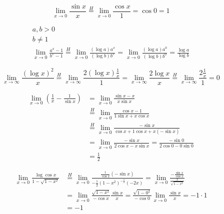 \begin{bsp}
	\[ \lim_{x \rightarrow 0} \frac{\sin x}{x} \overset{H}{=} \lim_{x \rightarrow 0} \frac{\cos x}{1} = \cos 0 = 1 \]
\end{bsp}
\begin{bsp}
	\begin{gather*}
		a,b > 0 \\
		b \neq 1 \\
		\lim_{x \rightarrow 0} \frac{a^x - 1}{b^x - 1} \overset{H}{=} \lim_{x \rightarrow 0} \frac{(\log a)a^x}{(\log b)b^x} = \lim_{x \rightarrow 0} \frac{(\log a)a^0}{(\log b)b^0} = \frac{\log a}{\log b}
	\end{gather*}
\end{bsp}
\begin{bsp}
	\[ \lim_{x \rightarrow \infty} \frac{(\log x)^2}{x} \overset{H}{=} \lim_{x \rightarrow \infty} \frac{2(\log x) \frac{1}{x}}{1} = \lim_{x \rightarrow \infty} \frac{2 \log x}{x} \overset{H}{=} \lim_{x \rightarrow \infty} \frac{2 \frac{1}{x}}{1} = 0 \]
\end{bsp}
\begin{bsp}
	\[ \begin{split}
		\lim_{x \rightarrow 0} \left( \frac{1}{x} - \frac{1}{\sin x} \right)	&= \lim_{x \rightarrow 0} \frac{\sin x - x}{x \sin x} \\
													&\overset{H}{=} \lim_{x \rightarrow 0} \frac{\cos x - 1}{1 \sin x + x \cos x} \\
													&\overset{H}{=} \lim_{x \rightarrow 0} \frac{-\sin x}{\cos x + 1 \cos x + x (-\sin x)} \\
													&= \lim_{x \rightarrow 0} \frac{-\sin x}{2\cos x - x \sin x} = \frac{-\sin 0}{2\cos 0 - 0\sin 0} \\
													&= \frac{1}{2}
		\end{split} \]
\end{bsp}
\begin{bsp}
	\[ \begin{split}
		\lim_{x \rightarrow 0}  \frac{\log \cos x}{1 - \sqrt{1-x^2}}	&\overset{H}{=} \lim_{x \rightarrow 0} \frac{\frac{1}{\cos x} (-\sin x)}{-\frac{1}{2} (1-x^2)^{-\frac{1}{2}} (-2x)} = \lim_{x \rightarrow 0} \frac{-\frac{\sin x}{\cos x}}{\frac{x}{\sqrt{1-x^2}}} \\
													&= \lim_{x \rightarrow 0}  \frac{\sqrt{1-x^2}}{-\cos x} \frac{\sin x}{x} = \frac{\sqrt{1-0^2}}{-\cos 0} \lim_{x \rightarrow 0} \frac{\sin x}{x} = -1 \cdot 1 \\
													&= -1
		\end{split} \]
\end{bsp}

